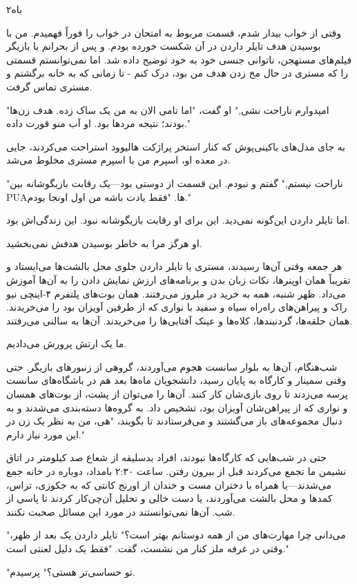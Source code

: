 ۲باه

وقتی از خواب بیدار شدم، قسمت مربوط به امتحان در خواب را فوراً فهمیدم. من با بوسیدن هدف تایلر داردن در آن شکست خورده بودم. و پس از بحرانم با بازیگر فیلم‌های مستهجن، ناتوانی جنسی خود به خود توضیح داده شد. اما نمی‌توانستم قسمتی را که مستری در حال مخ زدن هدف من بود، درک کنم - تا زمانی که به خانه برگشتم و مستری تماس گرفت.

"امیدوارم ناراحت نشی," او گفت، "اما تامی الان به من یک ساک زده. هدف زن‌ها بودند؛ نتیجه مردها بود. او آب منو قورت داده."

به جای مدل‌های باکینی‌پوش که کنار استخر پراژکت هالیوود استراحت می‌کردند، جایی در معده او، اسپرم من با اسپرم مستری مخلوط می‌شد.

"ناراحت نیستم," گفتم و نبودم. این قسمت از دوستی بود—یک رقابت بازیگوشانه بین PUA‌ها. "فقط یادت باشه من اول اونجا بودم."

اما تایلر داردن این‌گونه نمی‌دید. این برای او رقابت بازیگوشانه نبود. این زندگی‌اش بود.

او هرگز مرا به خاطر بوسیدن هدفش نمی‌بخشید.

هر جمعه وقتی آن‌ها رسیدند، مستری یا تایلر داردن جلوی محل بالشت‌ها می‌ایستاد و تقریباً همان اوپنرها، نکات زبان بدن و برنامه‌های ارزش نمایش دادن را به آن‌ها آموزش می‌داد. ظهر شنبه، همه به خرید در ملروز می‌رفتند. همان بوت‌های پلتفرم ۴-اینچی نیو راک و پیراهن‌های راه‌راه سیاه و سفید با نواری که از طرفین آویزان بود را می‌خریدند. همان حلقه‌ها، گردنبندها، کلاه‌ها و عینک آفتابی‌ها را می‌خریدند. آن‌ها به سالنی می‌رفتند.

ما یک ارتش پرورش می‌دادیم.

شب‌هنگام، آن‌ها به بلوار سانست هجوم می‌آوردند، گروهی از زنبورهای بازیگر. حتی وقتی سمینار و کارگاه به پایان رسید، دانشجویان ماه‌ها بعد هم در باشگاه‌های سانست پرسه می‌زدند تا روی بازی‌شان کار کنند. آن‌ها را می‌توان از پشت، از بوت‌های همسان و نواری که از پیراهن‌شان آویزان بود، تشخیص داد. به گروه‌ها دسته‌بندی می‌شدند و به دنبال مجموعه‌های باز می‌گشتند و می‌فرستادند تا بگویند، "هی، من به نظر یک زن در این مورد نیاز دارم."

حتی در شب‌هایی که کارگاه‌ها نبودند، افراد بدسلیقه از شعاع صد کیلومتر در اتاق نشیمن ما تجمع می‌کردند قبل از بیرون رفتن. ساعت ۲:۳۰ بامداد، دوباره در خانه جمع می‌شدند—یا همراه با دختران مست و خندان از اورنج کانتی که به جکوزی، تراس، کمدها و محل بالشت می‌آوردند، یا دست خالی و تحلیل آن‌چی‌کار کردند تا پاسی از شب. آن‌ها نمی‌توانستند در مورد این مسائل صحبت نکنند.

"می‌دانی چرا مهارت‌های من از همه دوستانم بهتر است؟" تایلر داردن یک بعد از ظهر، وقتی در غرفه ملز کنار من نشست، گفت. "فقط یک دلیل لعنتی است."

"تو حساسی‌تر هستی؟" پرسیدم.